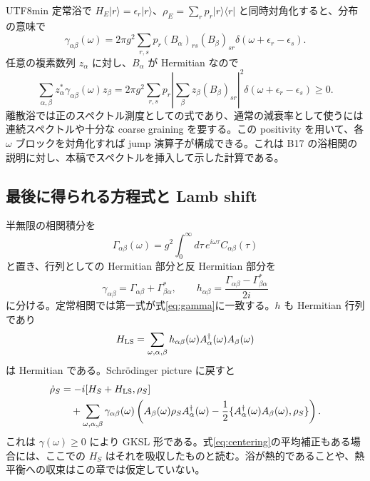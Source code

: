 \documentclass[11pt,a4paper]{article}
\numberwithin{equation}{section}
\newcommand{\ket}[1]{\lvert#1\rangle}
\newcommand{\bra}[1]{\langle#1\rvert}
\begin{document}
\begin{CJK*}{UTF8}{min}
定常浴で $H_E\ket{r}=\epsilon_r\ket{r}$、$\rho_E=\sum_r p_r\ket{r}\bra{r}$ と同時対角化すると、分布の意味で
\begin{equation}
\gamma_{\alpha\beta}(\omega)=2\pi g^2\sum_{r,s}p_r
(B_\alpha)_{rs}(B_\beta)_{sr}
\delta(\omega+\epsilon_r-\epsilon_s).
\label{eq:gammapsd}
\end{equation}
任意の複素数列 $z_\alpha$ に対し、$B_\alpha$ が Hermitian なので
\begin{equation}
\sum_{\alpha,\beta}z_\alpha^*\gamma_{\alpha\beta}(\omega)z_\beta
=2\pi g^2\sum_{r,s}p_r
\left|\sum_\beta z_\beta(B_\beta)_{sr}\right|^2
\delta(\omega+\epsilon_r-\epsilon_s)\geq0.
\end{equation}
離散浴では正のスペクトル測度としての式であり、通常の減衰率として使うには連続スペクトルや十分な coarse graining を要する。この positivity を用いて、各 $\omega$ ブロックを対角化すれば jump 演算子が構成できる。これは B17 の浴相関の説明に対し、本稿でスペクトルを挿入して示した計算である。

\subsection{最後に得られる方程式と Lamb shift}
半無限の相関積分を
\begin{equation}
\Gamma_{\alpha\beta}(\omega)=g^2\int_0^\infty d\tau\,
e^{i\omega\tau}C_{\alpha\beta}(\tau)
\end{equation}
と置き、行列としての Hermitian 部分と反 Hermitian 部分を
\begin{equation}
\gamma_{\alpha\beta}=\Gamma_{\alpha\beta}+\Gamma_{\beta\alpha}^*,
\qquad h_{\alpha\beta}=
\frac{\Gamma_{\alpha\beta}-\Gamma_{\beta\alpha}^*}{2i}
\label{eq:Gamma-decomposition}
\end{equation}
に分ける。定常相関では第一式が式\eqref{eq:gamma}に一致する。$h$ も Hermitian 行列であり
\begin{equation}
H_{\rm LS}=\sum_{\omega,\alpha,\beta}
h_{\alpha\beta}(\omega)A_\alpha^\dagger(\omega)A_\beta(\omega)
\label{eq:lambshift}
\end{equation}
は Hermitian である。Schrödinger picture に戻すと
\begin{align}
\dot\rho_S
&=-i[H_S+H_{\rm LS},\rho_S]\nonumber\\
&\quad+\sum_{\omega,\alpha,\beta}\gamma_{\alpha\beta}(\omega)
\left(A_\beta(\omega)\rho_SA_\alpha^\dagger(\omega)
-\frac12\{A_\alpha^\dagger(\omega)A_\beta(\omega),\rho_S\}\right).
\label{eq:microscopic-gksl}
\end{align}
これは $\gamma(\omega)\geq0$ により GKSL 形である。式\eqref{eq:centering}の平均補正もある場合には、ここでの $H_S$ はそれを吸収したものと読む。浴が熱的であることや、熱平衡への収束はこの章では仮定していない。


\end{CJK*}
\end{document}
